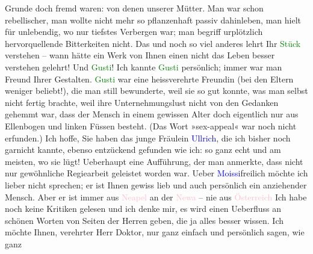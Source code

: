                Grunde doch fremd waren: von denen unserer Mütter. Man war schon rebellischer, man
               wollte nicht mehr so pflanzenhaft passiv dahinleben, man hielt für unlebendig, wo nur
               tiefstes Verbergen war; man begriff urplötzlich hervorquellende Bitterkeiten nicht.
               Das und noch so viel anderes lehrt Ihr \textcolor{green}{Stück}{} verstehen – wann hätte ein Werk von Ihnen einen nicht das Leben besser
               verstehen gelehrt!\pend
           \pstart
           Und \textcolor{green}{Gusti}{}! Ich kannte \textcolor{green}{Gusti}{} persönlich; immer war man
               Freund Ihrer Gestalten. \textcolor{green}{Gusti}{} war
               eine heissverehrte Freundin (bei den Eltern weniger beliebt!), die man still
               bewunderte, weil sie so gut konnte, was man selbst nicht fertig brachte, weil ihre
               Unternehmungslust nicht von den Gedanken gehemmt war, dass der Mensch in einem
               gewissen Alter doch eigentlich nur aus Ellenbogen und linken Füssen besteht. (Das
               Wort »sex-appeal« war noch nicht erfunden.) Ich hoffe, Sie haben das junge Fräulein
                  \textcolor{blue}{Ullrich}{}\ledrightnote{\textcolor{blue}{Luise Ullrich}}, die ich bisher noch garnicht kannte,
               ebenso entzückend gefunden wie ich: so ganz echt und am meisten, wo sie lügt!\pend
           \pstart
           Ueberhaupt eine Aufführung, der man anmerkte, dass nicht nur gewöhnliche Regiearbeit
               geleistet worden war. Ueber \textcolor{blue}{Moissi}{}\ledrightnote{\textcolor{blue}{Alexander Moissi}}{ }{\pb}freilich möchte ich lieber nicht
               sprechen; er ist Ihnen gewiss lieb und auch persönlich ein anziehender Mensch. Aber
               er ist immer aus \textcolor{pink}{Neapel}{}\ledrightnote{\textcolor{pink}{Neapel}} an der \textcolor{pink}{Newa}{}\ledrightnote{\textcolor{pink}{Newa}} – nie aus \textcolor{pink}{Österreich}{}\ledrightnote{\textcolor{pink}{Österreich}}{\dots}\pend
           \pstart
           Ich habe noch keine Kritiken gelesen und ich denke mir, es wird einen Ueberfluss an
               schönen Worten von Seiten der Herren geben, die ja alles besser wissen. Ich möchte
               Ihnen, verehrter Herr Doktor, nur ganz einfach und persönlich sagen, wie ganz
